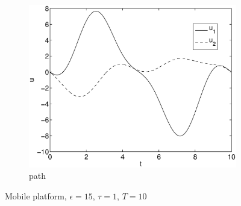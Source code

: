 \begin{figure}[h]
\begin{subfigure}[b]{\textwidth}
\centering
\includegraphics[height=0.3\textheight]{img/final_15_1_10_u.eps}
\caption{path}
\end{subfigure}
\caption{Mobile platform, $\epsilon=15$, $\tau=1$, $T=10$}
\label{fig:pl1}
\end{figure}

